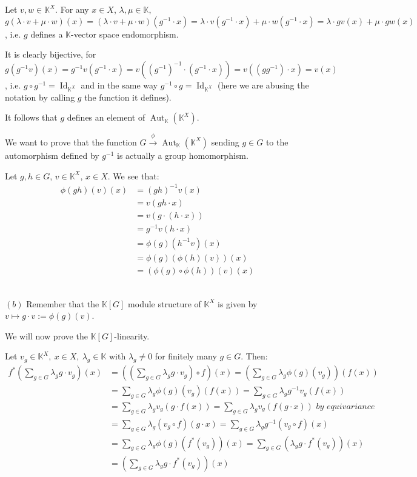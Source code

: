 \documentclass{article}
\newcommand{\numberset}{\mathbb}
\newcommand{\K}{\numberset{K}}
\DeclareMathOperator{\Id}{Id}
\DeclareMathOperator{\Aut}{Aut}
\begin{document}
Let $v,w\in\K^X$. For any $x\in X$, $\lambda,\mu\in\K$,
$g(\lambda\cdot v+\mu\cdot w)(x)=(\lambda\cdot v+\mu\cdot w)(g^{-1}\cdot x)=
\lambda\cdot v(g^{-1}\cdot x)+\mu\cdot w(g^{-1}\cdot x)=\lambda\cdot gv(x)+\mu\cdot gw
(x)$, i.e. $g$ defines a $\K$-vector space endomorphism.

It is clearly bijective, for $g(g^{-1}v)(x)=g^{-1}v(g^{-1}\cdot x)=v(
(g^{-1})^{-1}\cdot (g^{-1}\cdot x))=v((gg^{-1})\cdot x)=v(x)$, i.e. $g\circ g^{-1}=\Id_{\K^X}$ and in
the same way $g^{-1}\circ g=\Id_{\K^X}$ (here we are abusing the notation by
calling $g$ the function it defines).

It follows that $g$ defines an element of $\Aut_{\K}(\K^X)$.

We want to prove that the function $G\xrightarrow{\phi}\Aut_{\K}(\K^X)$ sending
$g\in G$ to the automorphism defined by $g^{-1}$ is actually a group homomorphism.

Let $g,h\in G$, $v\in\K^X$, $x\in X$. We see that:
\begin{align*}
    \phi(gh)(v)(x) & =(gh)^{-1}v(x) \\
    & =v(gh\cdot x) \\
    & =v(g\cdot (h\cdot x)) \\
    & =g^{-1}v(h\cdot x) \\
    & =\phi(g)(h^{-1}v)(x) \\
    & =\phi(g)(\phi(h)(v))(x) \\
    & =(\phi(g)\circ\phi(h))(v)(x)
\end{align*}

~\\
$(b)$ Remember that the $\K[G]$ module structure of $\K^X$ is given by $v\mapsto
g\cdot v:=\phi(g)(v)$.

We will now prove the $\K[G]$-linearity.

Let $v_g\in\K^X,\ x\in X,\ \lambda_g\in\K$ with $\lambda_g\neq 0$ for finitely
many $g\in G$. Then:
\begin{align*}
    f^*\left(\sum_{g\in G}\lambda_g g\cdot v_g\right)(x) & = \left(\left(\sum_{g\in G}\lambda_g
    g\cdot v_g\right)\circ f\right)(x)=\left(\sum_{g\in
    G}\lambda_g\phi(g)(v_g)\right)(f(x)) \\
    & = \sum_{g\in G}\lambda_g\phi(g)(v_g)(f(x))=\sum_{g\in G}\lambda_g g^{-1}
    v_g(f(x)) \\
    & = \sum_{g\in G}\lambda_g v_g(g\cdot f(x))=\sum_{g\in G}\lambda_g
    v_g(f(g\cdot x))\textit{ by equivariance} \\
    & = \sum_{g\in G}\lambda_g (v_g\circ f)(g\cdot x)=\sum_{g\in G}\lambda_g
    g^{-1}(v_g\circ f)(x) \\
    & = \sum_{g\in G}\lambda_g\phi(g)(f^*(v_g))(x)=\sum_{g\in G}(\lambda_g
    g\cdot f^*(v_g))(x) \\
    & = \left(\sum_{g\in G}\lambda_g g\cdot f^*(v_g)\right)(x)
\end{align*}
\end{document}
